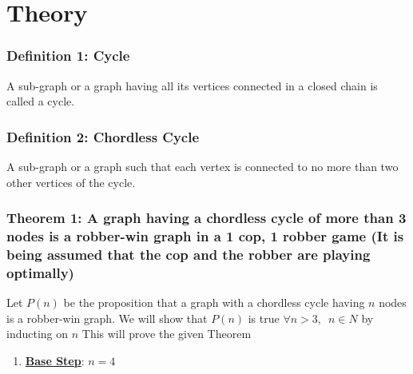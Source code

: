 \chapter{Theory}
\subsection{Definition 1: Cycle}
A sub-graph or a graph having all its vertices connected in a closed chain is called a cycle. 
\subsection{Definition 2: Chordless Cycle}
A sub-graph or a graph such that each vertex is connected to no more than two other vertices of the cycle. 
\subsection{Theorem 1: A graph having a chordless cycle of more than 3 nodes is a robber-win graph in a 1 cop, 1 robber game (It is being assumed that the cop and the robber are playing optimally)}
Let $P(n)$ be the proposition that a graph with a chordless cycle having $n$ nodes is a robber-win graph. 
We will show that $P(n)$ is true $\forall n > 3,\,\,\,n\in N$ by inducting on $n$ 
This will prove the given Theorem
	\begin{enumerate}
		\item \underline{\textbf{Base Step}}: $n = 4$
		
	\end{enumerate}